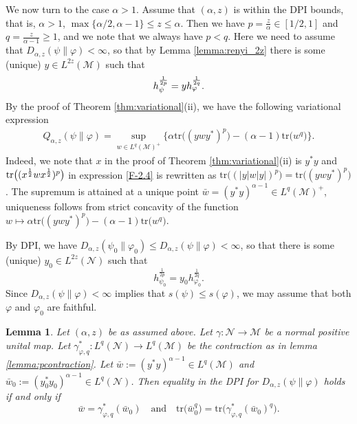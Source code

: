 \documentclass[12pt]{article}
\newtheorem{lemma}[theorem]{Lemma}
\theoremstyle{definition}
\theoremstyle{remark}
\numberwithin{equation}{section}
\def\Me{\mathcal M}
\def\Ne{\mathcal N}
\def\Tr{\mathrm{tr}}
\def\ffi{\varphi}
\begin{document}
We now turn to the case $\alpha>1$. Assume that $(\alpha,z)$ is within the DPI bounds,
that is, $\alpha>1$, $\max\{\alpha/2,\alpha-1\}\le z\le\alpha$.  Then
we have $p=\frac z\alpha\in [1/2,1]$ and $q=\frac z{\alpha-1}\ge 1$, and we note that we always have $p<q$.
Here we need to assume that $D_{\alpha,z}(\psi\|\ffi)<\infty$, so that by Lemma \ref{lemma:renyi_2z}
there is some (unique) $y\in L^{2z}(\Me)$ such that
\[
h_{\psi}^{1\over 2p}=y h_\ffi^{1\over 2q}.
\]
By the proof of Theorem \ref{thm:variational}(ii), we have the following variational expression
\begin{align}\label{eq:variationalq}
Q_{\alpha,z}(\psi\|\varphi) =\sup_{w\in
L^q(\Me)^+}\bigl\{\alpha\Tr\bigl((ywy^*)^p\bigr)-(\alpha-1)\Tr\bigl(w^q\bigr)\bigr\}.
\end{align}
Indeed, we note that $x$ in the proof of Theorem \ref{thm:variational}(ii) is $y^*y$ and
$\Tr\bigl((x^{1\over2}wx^{1\over2})^p\bigr)$ in expression \eqref{F-2.4} is rewritten as
$\Tr\bigl((|y|w|y|)^p\bigr)=\Tr\bigl((ywy^*)^p\bigr)$.
The supremum is attained at a unique point $\bar
w=(y^*y)^{\alpha-1}\in L^q(\Me)^+$, uniqueness follows from strict concavity of the
function $w\mapsto \alpha\Tr\bigl((ywy^*)^p\bigr)-(\alpha-1)\Tr\bigl( w^q\bigr)$.


By DPI, we have $D_{\alpha,z}(\psi_0\|\varphi_0)\le D_{\alpha,z}(\psi\|\varphi)<\infty$,
so that there is some (unique) $y_0\in L^{2z}(\Ne)$ such that 
\[
h_{\psi_0}^{\frac1{2p}}=y_0h_{\varphi_0}^{\frac1{2q}}.
\]
Since $D_{\alpha,z}(\psi\|\ffi)<\infty$ implies that $s(\psi)\le s(\ffi)$, we may assume that both $\ffi$ and
$\ffi_0$ are faithful.


\begin{lemma}\label{lemma:le}
Let $(\alpha,z)$ be as assumed above. Let $\gamma:\Ne\to\Me$ be a normal positive unital map. 
Let $\gamma^*_{\ffi,q}:L^q(\Ne)\to L^q(\Me)$ be the contraction as in lemma \ref{lemma:pcontraction}. 
Let $\bar w:=(y^*y)^{\alpha-1}\in L^q(\Me)$ and $\bar w_0:=(y_0^*y_0)^{\alpha-1}\in
L^q(\Ne)$. Then equality in the DPI for $D_{\alpha,z}(\psi\|\ffi)$ holds if and only if
\begin{equation}\label{eq:dpiw}
\bar w=\gamma^*_{\ffi,q}(\bar w_0)\quad \text{and}\quad  
\Tr\bigl(\bar w_0^q\bigr)=\Tr\bigl(\gamma^*_{\varphi,q}(\bar w_0)^q\bigr).
\end{equation}
\end{lemma}
\end{document}
